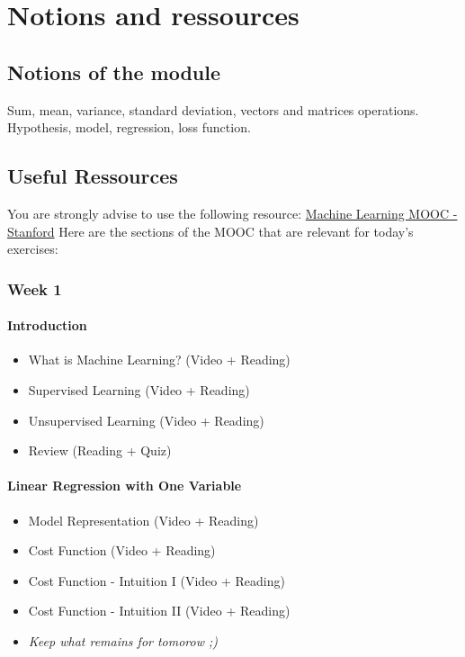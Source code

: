 

\chapter*{Notions and ressources}

\section*{Notions of the module}
Sum, mean, variance, standard deviation, vectors and matrices operations.  
Hypothesis, model, regression, loss function. 

\section*{Useful Ressources}

You are strongly advise to use the following resource:
\href{https://www.coursera.org/learn/machine-learning/home/week/1}{Machine Learning MOOC - Stanford}
Here are the sections of the MOOC that are relevant for today's exercises: 

\subsection*{Week 1}

\subsubsection*{Introduction}
\begin{itemize}
  \item What is Machine Learning? (Video + Reading)
  \item Supervised Learning (Video + Reading)
  \item Unsupervised Learning (Video + Reading)
  \item Review (Reading + Quiz)
\end{itemize}
    
\subsubsection*{Linear Regression with One Variable}  
\begin{itemize}
  \item Model Representation (Video + Reading)
  \item Cost Function (Video + Reading)
  \item Cost Function - Intuition I (Video + Reading)
  \item Cost Function - Intuition II (Video + Reading)
  \item \textit{Keep what remains for tomorow ;)}
\end{itemize}

